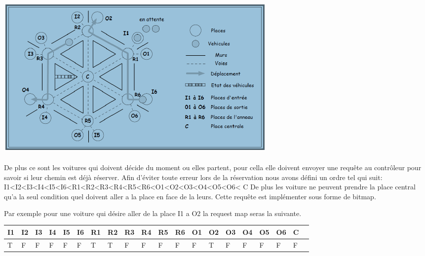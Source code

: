 \documentclass[a4paper, titlepage]{report}
\begin{document}
\includegraphics[]{Images/Plateau}
\\
\\
De plus ce sont les voitures qui doivent décide du moment ou elles partent, pour cella elle doivent envoyer une requête au contrôleur pour savoir si leur chemin est déjà réserver. Afin d'éviter toute erreur lors de la réservation nous avons défini un ordre tel qui suit: 
			I1<I2<I3<I4<I5<I6<R1<R2<R3<R4<R5<R6<O1<O2<O3<O4<O5<O6< C
De plus les voiture ne peuvent prendre la place central qu'a la seul condition quel doivent aller a la place en face de la leurs.
Cette requête est implémenter sous forme de bitmap.

Par exemple pour une voiture qui désire aller de la place I1 a O2 la request map seras la suivante.




\begin{tabular}{|l|l|l|l|l|l|l|l|l|l|l|l|l|l|l|l|l|l|l|l|}

\hline
  I1 & I2 & I3 & I4 & I5 & I6 & R1 & R2 & R3 & R4 & R5 & R6 & O1 & O2 & O3 & O4 & O5 & O6 & C \\
  \hline
   T & F & F & F & F & F & T & T & F & F & F & F & F & T & F & F & F & F & F\\
 \hline

\end{tabular}
\end{document}
